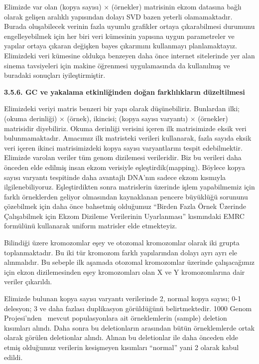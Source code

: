 \documentclass[11pt]{article}
\begin{document}
Elimizde var olan (kopya sayısı) $\times$ (örnekler) matrisinin  ekzom datasına bağlı olarak gelişen aralıklı yapısından dolayı SVD bazen yeterli olamamaktadır. Burada oluşabilecek verinin fazla uyumlu grafikler ortaya çıkarabilmesi durumunu engelleyebilmek için her biri veri kümesinin yapısına uygun parametreler ve yapılar ortaya çıkaran değişken bayes çıkarımını kullanmayı planlamaktayız. Elimizdeki veri kümesine oldukça benzeyen daha önce internet sitelerinde yer alan sinema tavsiyeleri için makine öğrenmesi uygulamasında da kullanılmış ve buradaki sonuçları iyileştirmiştir.

{\bf 3.5.6. GC ve yakalama etkinliğinden doğan farklılıkların düzeltilmesi}

Elimizdeki veriyi matris benzeri bir yapı olarak düşünebiliriz. Bunlardan ilki; (okuma derinliği) $\times$ (örnek), ikincisi; (kopya sayısı varyantı) $\times$ (örnekler) matrisidir  diyebiliriz. Okuma derinliği verisini içeren ilk matrisimizde eksik veri bulunmamaktadır. Amacımız ilk matristeki verileri kullanarak, fazla sayıda eksik veri içeren ikinci matrisimizdeki kopya sayısı varyantlarını tespit edebilmektir. Elimizde varolan veriler tüm genom dizilemesi verileridir. Biz bu verileri daha önceden elde edilmiş insan ekzom verisiyle eşleştirdik(mapping). Böylece kopya sayısı varyantı tespitinde daha avantajlı DNA'nın sadece ekzom kısmıyla ilgilenebiliyoruz. Eşleştirdikten sonra matrislerin üzerinde işlem yapabilmemiz için farklı örneklerden  geliyor olmasından kaynaklanan pencere büyüklüğü sorununu çözebilmek için daha önce bahsetmiş olduğumuz ``Birden Fazla Örnek Üzerinde Çalışabilmek için Ekzom Dizileme Verilerinin Uyarlanması'' kısmındaki EMRC formülünü kullanarak uniform matrisler elde etmekteyiz.

Bilindiği üzere kromozomlar eşey ve otozomal kromozomlar olarak iki grupta toplanmaktadır. Bu iki tür kromozom farklı yapılarından dolayı ayrı ayrı ele alınmalıdır. Bu sebeple ilk aşamada otozomal kromozomlar üzerinde çalışacağımız için ekzon dizilemesinden eşey kromozomları olan X ve Y kromozomlarına dair veriler çıkarıldı. 

Elimizde bulunan kopya sayısı varyantı verilerinde 2, normal kopya sayısı; 0-1 delesyon; 3 ve daha fazlası duplikasyon görüldüğünü belirtmektedir. 1000 Genom Projesi'nden~\cite{1000GP2012} mevcut populasyonlara ait örneklemlerin (sample) deletion kısımları alındı. Daha sonra bu deletionların arasından bütün örneklemlerde ortak olarak görülen deletionlar alındı. Alınan bu deletionlar ile daha önceden elde etmiş olduğumuz verilerin kesişmeyen kısımları ``normal'' yani 2 olarak kabul edildi.
\end{document}
